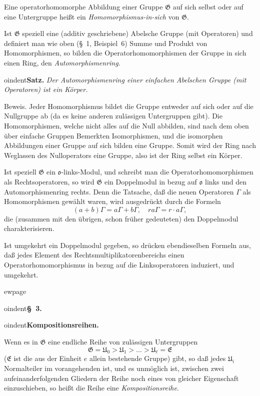 \documentclass[12pt,a4paper]{article}
\theoremstyle{definition}
\begin{document}
\medskip

Eine operatorhomomorphe Abbildung einer Gruppe $\mathfrak{G}$ auf sich
selbst oder auf eine Untergruppe hei\ss t ein \textit{Homomorphismus-in-sich}
von $\mathfrak{G}$.

Ist $\mathfrak{G}$ speziell eine (additiv geschriebene) Abelsche Gruppe
(mit Operatoren) und definiert man wie oben (\S~1, Beispiel~6) Summe und
Produkt von Homomorphismen, so bilden die Operatorhomomorphismen der
Gruppe in sich einen Ring, den \textit{Automorphismenring}.

\medskip



oindent\textbf{Satz.} \textit{Der Automorphismenring einer einfachen
Abelschen Gruppe (mit Operatoren) ist ein K\"orper.}

Beweis. Jeder Homomorphismus bildet die Gruppe entweder auf sich oder
auf die Nullgruppe ab (da es keine anderen zul\"assigen Untergruppen
gibt). Die Homomorphismen, welche nicht alles auf die Null abbilden,
sind nach dem oben \"uber einfache Gruppen Bemerkten Isomorphismen, und
die isomorphen Abbildungen einer Gruppe auf sich bilden eine Gruppe.
Somit wird der Ring nach Weglassen des Nulloperators eine Gruppe, also
ist der Ring selbst ein K\"orper.

\medskip

Ist speziell $\mathfrak{G}$ ein $\mathfrak{o}$-links-Modul, und schreibt
man die Operatorhomomorphismen als Rechtsoperatoren, so wird
$\mathfrak{G}$ ein Doppelmodul in bezug auf $\mathfrak{o}$ links und den
Automorphismenring rechts. Denn die Tatsache, da\ss{} die neuen Operatoren
$\Gamma$ als Homomorphismen gew\"ahlt waren, wird ausgedr\"uckt durch
die Formeln
\[
(a+b)\Gamma = a\Gamma + b\Gamma, \quad ra\Gamma = r \cdot a\Gamma,
\]
die (zusammen mit den \"ubrigen, schon fr\"uher gedeuteten) den
Doppelmodul charakterisieren.

Ist umgekehrt ein Doppelmodul gegeben, so dr\"ucken ebendieselben
Formeln aus, da\ss{} jedes Element des Rechtsmultiplikatorenbereichs einen
Operatorhomomorphismus in bezug auf die Linksoperatoren induziert, und
umgekehrt.



ewpage
\setcounter{page}{585}



oindent\textbf{\S~3.}



oindent\textbf{Kompositionsreihen.}

Wenn es in $\mathfrak{G}$ eine endliche Reihe von zul\"assigen
Untergruppen
\[
\mathfrak{G} = \mathfrak{U}_0 > \mathfrak{U}_1 > \dots >
\mathfrak{U}_\ell = \mathfrak{E}
\]
($\mathfrak{E}$ ist die aus der Einheit $e$ allein bestehende Gruppe)
gibt, so da\ss{} jedes $\mathfrak{U}_i$ Normalteiler im vorangehenden ist,
und es unm\"oglich ist, zwischen zwei aufeinanderfolgenden Gliedern der
Reihe noch eines von gleicher Eigenschaft einzuschieben, so hei\ss t die
Reihe eine \textit{Kompositionsreihe}.
\end{document}
